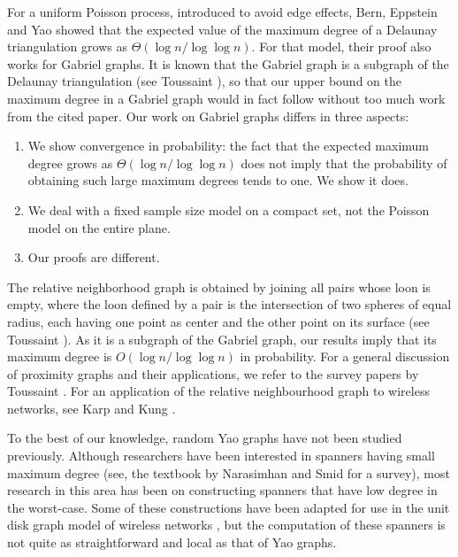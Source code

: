 \documentclass[10pt]{llncs}
\begin{document}
For a uniform Poisson process, introduced to avoid edge effects, Bern,
Eppstein and Yao \cite{bey91} showed that the expected value of the maximum
degree of a Delaunay triangulation grows as $\Theta(\log n/\log\log n)$.
For that model, their proof also works for Gabriel graphs.  It is known
that the Gabriel graph is a subgraph of the Delaunay triangulation (see
Toussaint \cite{t80b}), so that our upper bound on the maximum degree in a
Gabriel graph would in fact follow without too much work from the cited
paper.  Our work on Gabriel graphs differs in three aspects:

\begin{enumerate}
\item We show convergence in probability: the fact that the expected
maximum degree grows as $\Theta(\log n /\log \log n)$ does not imply that the
probability of obtaining such large maximum degrees tends to one. We
show it does.

\item We deal with a fixed sample size model on a compact set, not the
Poisson model on the entire plane.

\item Our proofs are different.
\end{enumerate}

The relative neighborhood graph is obtained by joining all pairs whose
loon is empty, where the loon defined by a pair is the intersection of two
spheres of equal radius, each having one point as center and the other
point on its surface (see Toussaint \cite{t80a}).  As it is a subgraph of
the Gabriel graph, our results imply that its maximum degree is $O(\log
n /\log \log n)$ in probability.  For a general discussion of proximity
graphs and their applications, we refer to the survey papers by Toussaint
\cite{t80b,t82}.  For an application of the relative neighbourhood graph to
wireless networks, see Karp and Kung \cite{kk00}.

To the best of our knowledge, random Yao graphs have not been studied
previously. Although researchers have been interested in spanners having
small maximum degree (see, the textbook by Narasimhan and Smid \cite{ns07}
for a survey), most research in this area has been on constructing spanners
that have low degree in the worst-case.  Some of these constructions have
been adapted for use in the unit disk graph model of wireless networks
\cite{wl06}, but the computation of these spanners is not quite as
straightforward and local as that of Yao graphs.
\end{document}
